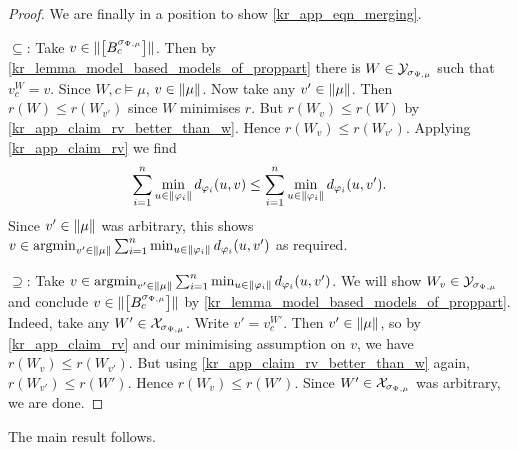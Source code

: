 \begin{proof}
    We are finally in a position to show \cref{kr_app_eqn_merging}.

    $\subseteq$: Take $v \in \|{\left[{B^{\sigma_{\Psi, \mu}}_c}\right]}\|$.
    Then by \cref{kr_lemma_model_based_models_of_proppart} there is $W \in
    \mathcal{Y}_{\sigma_{\Psi, \mu}}$ such that $v^W_c = v$. Since $W, c \models \mu$,
    $v \in \|{\mu}\|$. Now take any $v' \in \|{\mu}\|$. Then $r(W)
    \le r(W_{v'})$ since $W$ minimises $r$. But $r(W_v) \le r(W)$ by
    \cref{kr_app_claim_rv_better_than_w}. Hence $r(W_v) \le r(W_{v'})$.
    Applying \cref{kr_app_claim_rv} we find
    \[
        \sum_{i=1}^{n}{
            \min_{u \in \|{\varphi_i}\|}{
                d_{\varphi_i}(u, v)
            }
        }
        \le
        \sum_{i=1}^{n}{
            \min_{u \in \|{\varphi_i}\|}{
                d_{\varphi_i}(u, v')
            }
        }.
    \]
    Since $v' \in \|{\mu}\|$ was arbitrary, this shows $v \in \argmin_{v'
    \in \propmods{\mu}}{\sum_{i=1}^{n}{\min_{u \in
    \propmods{\phi_i}}{d_{\phi_i}(u, v')}}}$ as required.

    $\supseteq$: Take $v \in \argmin_{v' \in
    \propmods{\mu}}{\sum_{i=1}^{n}{\min_{u \in \propmods{\phi_i}}{d_{\phi_i}(u,
    v')}}}$. We will show $W_v \in \mathcal{Y}_{\sigma_{\Psi, \mu}}$ and conclude $v \in
    \|{\left[{B^{\sigma_{\Psi, \mu}}_c}\right]}\|$ by
    \cref{kr_lemma_model_based_models_of_proppart}. Indeed, take any $W' \in
    \mathcal{X}_{\sigma_{\Psi, \mu}}$. Write $v' = v^{W'}_c$. Then $v' \in
    \|{\mu}\|$, so by \cref{kr_app_claim_rv} and our minimising
    assumption on $v$, we have $r(W_v) \le r(W_{v'})$. But using
    \cref{kr_app_claim_rv_better_than_w} again, $r(W_{v'}) \le r(W')$. Hence
    $r(W_v) \le r(W')$. Since $W' \in \mathcal{X}_{\sigma_{\Psi, \mu}}$ was arbitrary,
    we are done.
\end{proof}

The main result follows.

\restatekrmergingthm*

